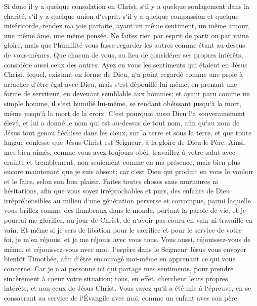 \verse Si donc il y a quelque consolation en Christ, s`il y a quelque soulagement dans la charité, s`il y a quelque union d`esprit, s`il y a quelque compassion et quelque miséricorde, 
\verse rendez ma joie parfaite, ayant un même sentiment, un même amour, une même âme, une même pensée. 
\verse Ne faites rien par esprit de parti ou par vaine gloire, mais que l`humilité vous fasse regarder les autres comme étant au-dessus de vous-mêmes. 
\verse Que chacun de vous, au lieu de considérer ses propres intérêts, considère aussi ceux des autres. 
\verse Ayez en vous les sentiments qui étaient en Jésus Christ, 
\verse lequel, existant en forme de Dieu, n`a point regardé comme une proie à arracher d`être égal avec Dieu, 
\verse mais s`est dépouillé lui-même, en prenant une forme de serviteur, en devenant semblable aux hommes; et ayant paru comme un simple homme, 
\verse il s`est humilié lui-même, se rendant obéissant jusqu`à la mort, même jusqu`à la mort de la croix. 
\verse C`est pourquoi aussi Dieu l`a souverainement élevé, et lui a donné le nom qui est au-dessus de tout nom, 
\verse afin qu`au nom de Jésus tout genou fléchisse dans les cieux, sur la terre et sous la terre, 
\verse et que toute langue confesse que Jésus Christ est Seigneur, à la gloire de Dieu le Père. 
\verse Ainsi, mes bien-aimés, comme vous avez toujours obéi, travaillez à votre salut avec crainte et tremblement, non seulement comme en ma présence, mais bien plus encore maintenant que je suis absent; 
\verse car c`est Dieu qui produit en vous le vouloir et le faire, selon son bon plaisir. 
\verse Faites toutes choses sans murmures ni hésitations, 
\verse afin que vous soyez irréprochables et purs, des enfants de Dieu irrépréhensibles au milieu d`une génération perverse et corrompue, parmi laquelle vous brillez comme des flambeaux dans le monde, 
\verse portant la parole de vie; et je pourrai me glorifier, au jour de Christ, de n`avoir pas couru en vain ni travaillé en vain. 
\verse Et même si je sers de libation pour le sacrifice et pour le service de votre foi, je m`en réjouis, et je me réjouis avec vous tous. 
\verse Vous aussi, réjouissez-vous de même, et réjouissez-vous avec moi. 
\verse J`espère dans le Seigneur Jésus vous envoyer bientôt Timothée, afin d`être encouragé moi-même en apprenant ce qui vous concerne. 
\verse Car je n`ai personne ici qui partage mes sentiments, pour prendre sincèrement à coeur votre situation; 
\verse tous, en effet, cherchent leurs propres intérêts, et non ceux de Jésus Christ. 
\verse Vous savez qu`il a été mis à l`épreuve, en se consacrant au service de l`Évangile avec moi, comme un enfant avec son père. 
